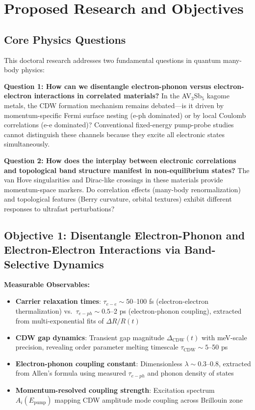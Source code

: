 \documentclass[12pt,a4paper]{article}
\begin{document}
\section{Proposed Research and Objectives}

\subsection{Core Physics Questions}

This doctoral research addresses two fundamental questions in quantum many-body physics:

\textbf{Question 1: How can we disentangle electron-phonon versus electron-electron interactions in correlated materials?} In the AV$_3$Sb$_5$ kagome metals, the CDW formation mechanism remains debated—is it driven by momentum-specific Fermi surface nesting (e-ph dominated) or by local Coulomb correlations (e-e dominated)? Conventional fixed-energy pump-probe studies cannot distinguish these channels because they excite all electronic states simultaneously.

\textbf{Question 2: How does the interplay between electronic correlations and topological band structure manifest in non-equilibrium states?} The van Hove singularities and Dirac-like crossings in these materials provide momentum-space markers. Do correlation effects (many-body renormalization) and topological features (Berry curvature, orbital textures) exhibit different responses to ultrafast perturbations?

\subsection{Objective 1: Disentangle Electron-Phonon and Electron-Electron Interactions via Band-Selective Dynamics}

\textbf{Measurable Observables:}
\begin{itemize}
    \item \textbf{Carrier relaxation times}: $\tau_{e-e} \sim 50$--100 fs (electron-electron thermalization) vs.~$\tau_{e-ph} \sim 0.5$--2 ps (electron-phonon coupling), extracted from multi-exponential fits of $\Delta R/R(t)$
    \item \textbf{CDW gap dynamics}: Transient gap magnitude $\Delta_{\text{CDW}}(t)$ with meV-scale precision, revealing order parameter melting timescale $\tau_{\text{CDW}} \sim 5$--50 ps
    \item \textbf{Electron-phonon coupling constant}: Dimensionless $\lambda \sim 0.3$--0.8, extracted from Allen's formula using measured $\tau_{e-ph}$ and phonon density of states
    \item \textbf{Momentum-resolved coupling strength}: Excitation spectrum $A_i(E_{\text{pump}})$ mapping CDW amplitude mode coupling across Brillouin zone
\end{itemize}
\end{document}
